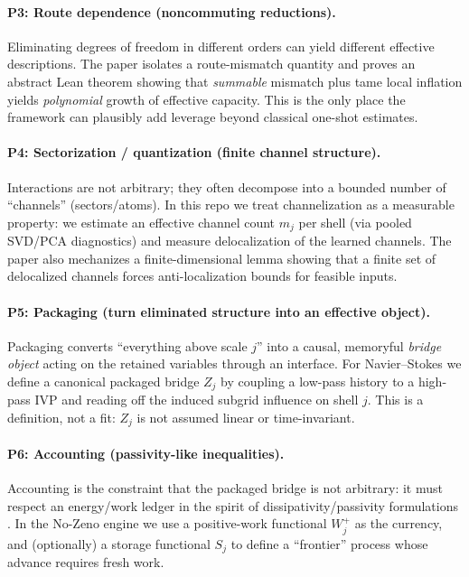 \documentclass[11pt]{article}
\begin{document}
\paragraph{P3: Route dependence (noncommuting reductions).}
Eliminating degrees of freedom in different orders can yield different effective descriptions. The paper isolates a route-mismatch quantity and proves an abstract Lean theorem showing that \emph{summable} mismatch plus tame local inflation yields \emph{polynomial} growth of effective capacity. This is the only place the framework can plausibly add leverage beyond classical one-shot estimates.

\paragraph{P4: Sectorization / quantization (finite channel structure).}
Interactions are not arbitrary; they often decompose into a bounded number of ``channels'' (sectors/atoms). In this repo we treat channelization as a measurable property: we estimate an effective channel count $m_j$ per shell (via pooled SVD/PCA diagnostics) and measure delocalization of the learned channels. The paper also mechanizes a finite-dimensional lemma showing that a finite set of delocalized channels forces anti-localization bounds for feasible inputs.

\paragraph{P5: Packaging (turn eliminated structure into an effective object).}
Packaging converts ``everything above scale $j$'' into a causal, memoryful \emph{bridge object} acting on the retained variables through an interface. For Navier--Stokes we define a canonical packaged bridge $Z_j$ by coupling a low-pass history to a high-pass IVP and reading off the induced subgrid influence on shell $j$. This is a definition, not a fit: $Z_j$ is not assumed linear or time-invariant.

\paragraph{P6: Accounting (passivity-like inequalities).}
Accounting is the constraint that the packaged bridge is not arbitrary: it must respect an energy/work ledger in the spirit of dissipativity/passivity formulations \citep{willems1972dissipative1}. In the No-Zeno engine we use a positive-work functional $W_j^+$ as the currency, and (optionally) a storage functional $S_j$ to define a ``frontier'' process whose advance requires fresh work.
\end{document}
